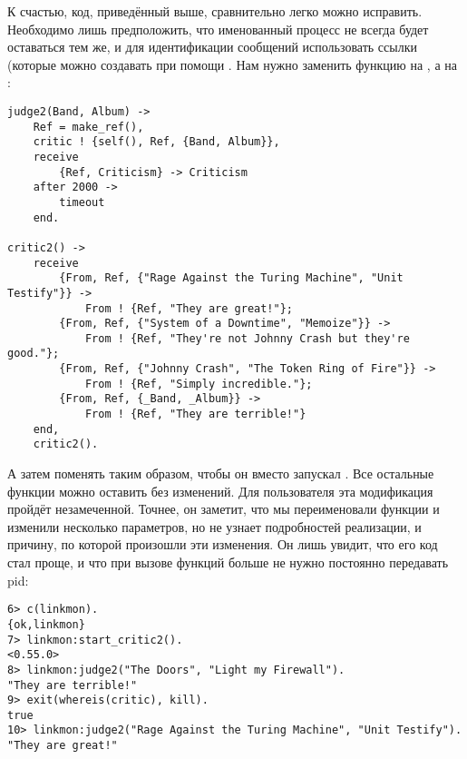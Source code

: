 К счастью, код, приведённый выше, сравнительно легко можно исправить.
Необходимо лишь предположить, что именованный процесс не всегда будет оставаться тем же, и для идентификации сообщений использовать ссылки (которые можно создавать при помощи .
Нам нужно заменить функцию  на , а  на :
\begin{lstlisting}[style=erlang]
judge2(Band, Album) ->
    Ref = make_ref(),
    critic ! {self(), Ref, {Band, Album}},
    receive
        {Ref, Criticism} -> Criticism
    after 2000 ->
        timeout
    end.
 
critic2() ->
    receive
        {From, Ref, {"Rage Against the Turing Machine", "Unit Testify"}} ->
            From ! {Ref, "They are great!"};
        {From, Ref, {"System of a Downtime", "Memoize"}} ->
            From ! {Ref, "They're not Johnny Crash but they're good."};
        {From, Ref, {"Johnny Crash", "The Token Ring of Fire"}} ->
            From ! {Ref, "Simply incredible."};
        {From, Ref, {_Band, _Album}} ->
            From ! {Ref, "They are terrible!"}
    end,
    critic2().
\end{lstlisting}

А затем поменять  таким образом, чтобы он вместо  запускал .
Все остальные функции можно оставить без изменений.
Для пользователя эта модификация пройдёт незамеченной.
Точнее, он заметит, что мы переименовали функции и изменили несколько параметров, но не узнает подробностей реализации, и причину, по которой произошли эти изменения.
Он лишь увидит, что его код стал проще, и что при вызове функций больше не нужно постоянно передавать pid:
\begin{lstlisting}[style=erlang]
6> c(linkmon).
{ok,linkmon}
7> linkmon:start_critic2().
<0.55.0>
8> linkmon:judge2("The Doors", "Light my Firewall").
"They are terrible!"
9> exit(whereis(critic), kill).
true
10> linkmon:judge2("Rage Against the Turing Machine", "Unit Testify").    
"They are great!"
\end{lstlisting}

